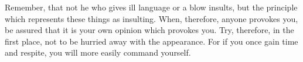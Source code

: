 Remember,  that not  he who  gives  ill language  or  a blow  insults, but  the
principle which represents  these things as insulting.  When, therefore, anyone
provokes you, be assured  that it is your own opinion  which provokes you. Try,
therefore, in the first place, not to  be hurried away with the appearance. For
if you once gain time and respite, you will more easily command yourself.
